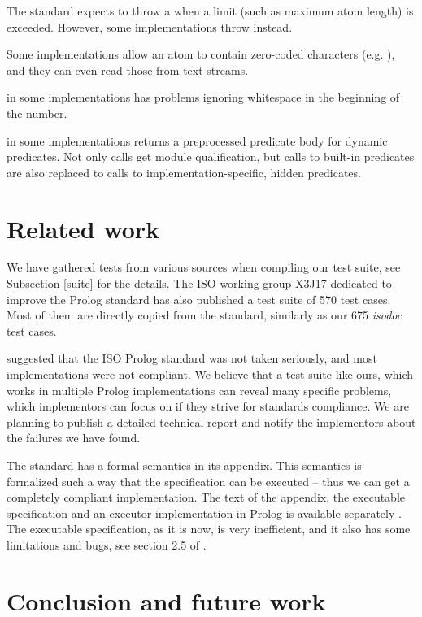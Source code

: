 \documentclass[draft]{llncs}%
\begin{document}
The standard expects  to throw a
 when a
limit (such as maximum atom length) is exceeded.
However, some implementations throw
 instead.

Some implementations allow an atom to contain zero-coded characters
(e.g. ), and they can even read those from text
streams.

 in some implementations has problems
ignoring whitespace in the beginning of the number.

 in some implementations returns a preprocessed predicate
body for dynamic predicates.
Not only calls get module qualification, but calls to built-in predicates
are also replaced to calls to implementation-specific, hidden predicates.


\section{Related work}

We have gathered tests from various sources when compiling our test suite,
see Subsection \ref{suite} for the details.
The ISO working group X3J17 dedicated to improve the Prolog standard has
also published a test suite \cite{validation} of 570 test cases. Most of
them are directly copied from the standard, similarly as our 675
\emph{iso\textunderscore doc} test cases.

\cite{seriously} suggested that the ISO Prolog standard was not taken
seriously, and most implementations were not compliant. We believe that a
test suite like ours, which works in multiple Prolog implementations can
reveal many specific problems, which implementors can focus on if
they strive for standards compliance. We are planning to publish a detailed
technical report and notify the implementors about the failures we have
found.

The standard has a formal semantics in its appendix. This semantics is
formalized such a way that the specification can be executed -- thus we can
get a completely compliant implementation. The text of the appendix, the
executable specification and an executor implementation in Prolog is
available separately \cite{executable}. The executable specification, as
it is now, is very inefficient, and it also has some limitations and bugs,
see section 2.5 of \cite{executable}.


\section{Conclusion and future work}
\end{document}
